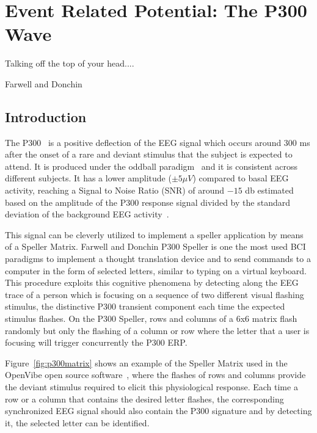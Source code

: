 \chapter{Event Related Potential: The P300 Wave}
\label{chapter:six}
\epigraph{Talking off the top of your head....}{Farwell and Donchin}

\section{Introduction}

The P300~\cite{Bashore1991,Farwell1988,Knuth2006} is a positive deflection of the EEG signal which occurs around $300$ ms after the onset of a rare and deviant stimulus that the subject is expected to attend.  It is produced under the oddball paradigm~\cite{WolpawJonathanR2012} and it is consistent across different subjects. It has a lower amplitude  ($\pm 5 \mu V $) compared to basal EEG activity, reaching a Signal to Noise Ratio (SNR) of around $-15$ db estimated based on the amplitude of the P300 response signal divided by the standard deviation of the background EEG activity~\cite{Hu2010}.  

This signal can be cleverly utilized to implement a speller application by means of a Speller Matrix. Farwell and Donchin P300 Speller \cite{Farwell1988} is one the most used BCI paradigms to implement a thought translation device and to send commands to a computer in the form of selected letters, similar to typing on a virtual keyboard.  This procedure exploits this cognitive phenomena by detecting along the EEG trace of a person which is focusing on a sequence of two different visual flashing stimulus, the distinctive P300 transient component each time the expected stimulus flashes.  On the P300 Speller, rows and columns of a 6x6 matrix flash randomly but only the flashing of a column or row where the letter that a user is focusing will trigger concurrently the P300 ERP.

Figure~\ref{fig:p300matrix} shows an example of the Speller Matrix used in the OpenVibe open source software~\cite{Renard2010}, where the flashes of rows and columns provide the deviant stimulus required to elicit this physiological response.   Each time a row or a column that contains the desired letter flashes, the corresponding synchronized EEG signal should also contain the P300 signature and by detecting it, the selected letter can be identified.

